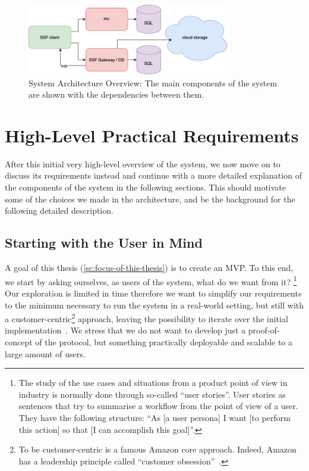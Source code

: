 \begin{figure}
    \centering
    \includegraphics[width=0.8\textwidth]{figures/architecture.png}
    \caption{System Architecture Overview: The main components of the system are shown with the dependencies between them.}
    \label{fig:architecture}
\end{figure}

\section{High-Level Practical Requirements}\label{sc:requirements}

After this initial very high-level overview of the system, we
now move on to discuss its requirements instead and continue with a more
detailed explanation of the components of the system in the following sections.
This should motivate some of the choices we made in the architecture,
and be the background for the following detailed description.

\subsection{Starting with the User in Mind}\label{sc:real-user}

A goal of this thesis (\cref{sc:focus-of-this-thesis})
is to create an MVP. To this end, we start by asking ourselves,
as users of the system, what do we want from it?
\footnote{The study of the use cases and situations from a product 
point of view in industry is normally done through so-called ``user stories''.
User stories as sentences that try to summarise a workflow from the
point of view of a user. They have the following structure:
``As [a user persona] I want [to perform this action] so that [I can accomplish this goal]''.}
Our exploration is limited in time therefore we want to simplify
our requirements to the minimum necessary to run the system
in a real-world setting, 
but still with a customer-centric\footnote{To be customer-centric is a famous Amazon core approach. Indeed, Amazon has a leadership principle called ``customer obsession''~\cite{AmazonLeadershipPrinciples}.}
approach, leaving the possibility to iterate over the initial implementation~\cite{ries2011startup}.
We stress that we do not want to develop just a proof-of-concept of the protocol,
but something practically deployable and scalable to a large
amount of users.

